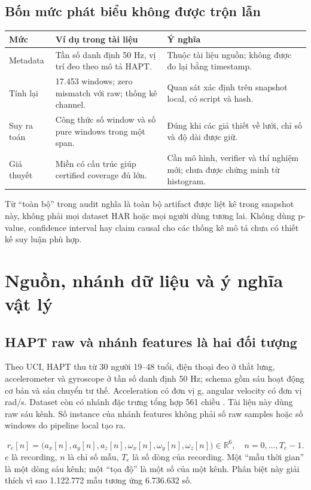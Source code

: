 \documentclass[11pt,a4paper]{article}
\newcommand{\R}{\mathbb R}
\theoremstyle{definition}
\begin{document}
\subsection{Bốn mức phát biểu không được trộn lẫn}
\begin{tabularx}{\linewidth}{@{}P{2.2cm}Y Y@{}}\toprule
Mức & Ví dụ trong tài liệu & Ý nghĩa\\\midrule
Metadata & Tần số danh định 50 Hz, vị trí đeo theo mô tả HAPT. & Thuộc tài liệu nguồn; không được đo lại bằng timestamp.\\
Tính lại & 17.453 windows; zero mismatch với raw; thống kê channel. & Quan sát xác định trên snapshot local, có script và hash.\\
Suy ra toán & Công thức số window và số pure windows trong một span. & Đúng khi các giả thiết về lưới, chỉ số và độ dài được giữ.\\
Giả thuyết & Miền có cấu trúc giúp certified coverage đủ lớn. & Cần mô hình, verifier và thí nghiệm mới; chưa được chứng minh từ histogram.\\\bottomrule
\end{tabularx}

Từ ``toàn bộ'' trong audit nghĩa là toàn bộ artifact được liệt kê trong
snapshot này, không phải mọi dataset HAR hoặc mọi người dùng tương lai.
Không dùng p-value, confidence interval hay claim causal cho các thống kê
mô tả chưa có thiết kế suy luận phù hợp.

\section{Nguồn, nhánh dữ liệu và ý nghĩa vật lý}
\subsection{HAPT raw và nhánh features là hai đối tượng}
Theo UCI, HAPT thu từ 30 người 19--48 tuổi, điện thoại đeo ở thắt lưng,
accelerometer và gyroscope ở tần số danh định 50 Hz; schema gồm sáu hoạt
động cơ bản và sáu chuyển tư thế. Acceleration có đơn vị g, angular velocity
có đơn vị rad/s. Dataset còn có nhánh đặc trưng tổng hợp 561 chiều
\cite{uci}. Tài liệu này dùng raw sáu kênh. Số instance của nhánh features
không phải số raw samples hoặc số windows do pipeline local tạo ra.

\begin{equation}
r_e[n]=\big(a_x[n],a_y[n],a_z[n],\omega_x[n],\omega_y[n],\omega_z[n]\big)
\in\R^6,\quad n=0,\ldots,T_e-1.
\end{equation}
$e$ là recording, $n$ là chỉ số mẫu, $T_e$ là số dòng của recording. Một
``mẫu thời gian'' là một dòng sáu kênh; một ``tọa độ'' là một số của một
kênh. Phân biệt này giải thích vì sao 1.122.772 mẫu tương ứng 6.736.632 số.
\end{document}
